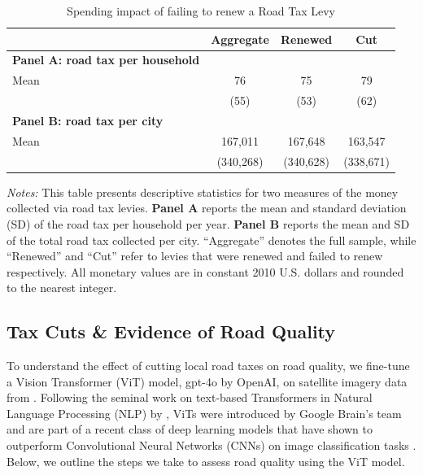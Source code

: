 \begin{table}[ht]
    \centering
    \caption{Spending impact of failing to renew a Road Tax Levy}
    \label{tab:levy_stats}
    \begin{threeparttable}
    \begin{tabular}{p{5cm}ccc}
    \hline\hline
    & \textbf{Aggregate} & \textbf{Renewed} & \textbf{Cut} \\
    \hline
    \textbf{Panel A: road tax per household} \\
    Mean & 76 & 75 & 79 \\
       & (55) & (53) & (62) \\
    \hline
    \textbf{Panel B: road tax per city} \\
    Mean & 167,011 & 167,648 & 163,547 \\
       & (340,268) & (340,628) & (338,671) \\
    \hline\hline
    \end{tabular}
    \begin{tablenotes}[flushleft]
      \footnotesize
      \item \textit{Notes:} 
      This table presents descriptive statistics for two measures of the money collected via road tax levies. 
      \textbf{Panel A} reports the mean and standard deviation (SD) of the road tax per household per year. 
      \textbf{Panel B} reports the mean and SD of the total road tax collected per city. 
      “Aggregate” denotes the full sample, while “Renewed” and “Cut” refer to levies that were renewed and failed to renew respectively.
      All monetary values are in constant 2010 U.S. dollars and rounded to the nearest integer.
    \end{tablenotes}
    \end{threeparttable}
\end{table}





\subsection{Tax Cuts \& Evidence of Road Quality} \label{sec:road_quality}

To understand the effect of cutting local road taxes on road quality, we fine-tune a Vision Transformer (ViT) model, gpt-4o by OpenAI, on satellite imagery data from \cite{brewer2021}. Following the seminal work on text-based Transformers in Natural Language Processing (NLP) by \cite{vaswani2017attention}, ViTs were introduced by Google Brain's team and are part of a recent class of deep learning models that have shown to outperform Convolutional Neural Networks (CNNs) on image classification tasks \citep{dosovitskiy2020image}. Below, we outline the steps we take to assess road quality using the ViT model.


